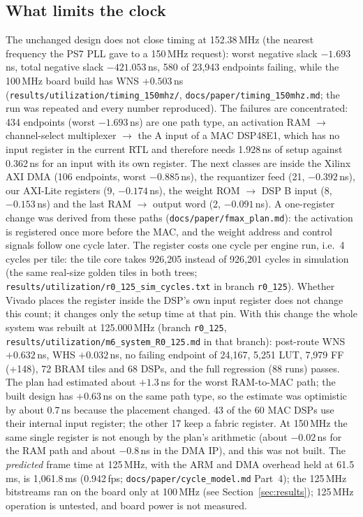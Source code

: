 \documentclass[conference]{IEEEtran}
\begin{document}
\subsection{What limits the clock}
The unchanged design does not close timing at 152.38\,MHz (the nearest frequency the PS7 PLL gave to a 150\,MHz request): worst negative slack $-1.693$\,ns, total negative slack $-421.053$\,ns, 580 of 23{,}943 endpoints failing, while the 100\,MHz board build has WNS $+0.503$\,ns (\texttt{results/\allowbreak{}utilization/\allowbreak{}timing\_150mhz/\allowbreak{}}, \texttt{docs/\allowbreak{}paper/\allowbreak{}timing\_150mhz.md}; the run was repeated and every number reproduced).
The failures are concentrated: 434 endpoints (worst $-1.693$\,ns) are one path type, an activation RAM $\to$ channel-select multiplexer $\to$ the A input of a MAC DSP48E1, which has no input register in the current RTL and therefore needs 1.928\,ns of setup against 0.362\,ns for an input with its own register.
The next classes are inside the Xilinx AXI DMA (106 endpoints, worst $-0.885$\,ns), the requantizer feed (21, $-0.392$\,ns), our AXI-Lite registers (9, $-0.174$\,ns), the weight ROM $\to$ DSP B input (8, $-0.153$\,ns) and the last RAM $\to$ output word (2, $-0.091$\,ns).
A one-register change was derived from these paths (\texttt{docs/\allowbreak{}paper/\allowbreak{}fmax\_plan.md}): the activation is registered once more before the MAC, and the weight address and control signals follow one cycle later. The register costs one cycle per engine run, i.e.\ 4 cycles per tile: the tile core takes 926{,}205 instead of 926{,}201 cycles in simulation (the same real-size golden tiles in both trees; \texttt{results/\allowbreak{}utilization/\allowbreak{}r0\_125\_sim\_cycles.txt} in branch \texttt{r0\_125}). Whether Vivado places the register inside the DSP's own input register does not change this count; it changes only the setup time at that pin.
With this change the whole system was rebuilt at 125.000\,MHz (branch \texttt{r0\_125}, \texttt{results/\allowbreak{}utilization/\allowbreak{}m6\_system\_R0\_125.md} in that branch): post-route WNS $+0.632$\,ns, WHS $+0.032$\,ns, no failing endpoint of 24{,}167, 5{,}251 LUT, 7{,}979 FF (+148), 72 BRAM tiles and 68 DSPs, and the full regression (88 runs) passes.
The plan had estimated about $+1.3$\,ns for the worst RAM-to-MAC path; the built design has $+0.63$\,ns on the same path type, so the estimate was optimistic by about 0.7\,ns because the placement changed. 43 of the 60 MAC DSPs use their internal input register; the other 17 keep a fabric register.
At 150\,MHz the same single register is not enough by the plan's arithmetic (about $-0.02$\,ns for the RAM path and about $-0.8$\,ns in the DMA IP), and this was not built.
The \emph{predicted} frame time at 125\,MHz, with the ARM and DMA overhead held at 61.5\,ms, is 1{,}061.8\,ms (0.942\,fps; \texttt{docs/\allowbreak{}paper/\allowbreak{}cycle\_model.md} Part~4); the 125\,MHz bitstreams ran on the board only at 100\,MHz (see Section~\ref{sec:results}); 125\,MHz operation is untested, and board power is not measured.
\end{document}
